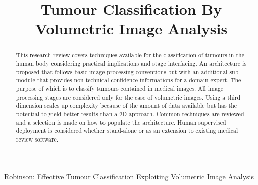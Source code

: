 \documentclass[journal]{IEEEtran}
\begin{document}
\title{Tumour Classification By Volumetric Image Analysis}
\author{
}


{Robinson: Effective Tumour Classification Exploiting Volumetric Image Analysis}

\maketitle


\begin{abstract}

This research review covers techniques available for the classification of tumours in the human body considering practical implications and stage interfacing.   
An architecture is proposed that follows basic image processing conventions but with an additional sub-module that provides non-technical confidence informations for a domain expert.  
The purpose of which is to classify tumours contained in medical images.
All image processing stages are considered only for the case of volumetric images.
Using a third dimension scales up complexity because of the amount of data available but has the potential to yield better results than a 2D approach.
Common techniques are reviewed and a selection is made on how to populate the architecture.
Human supervised deployment is considered whether stand-alone or as an extension to existing medical review software.

\end{abstract}










\IEEEpeerreviewmaketitle
\end{document}
